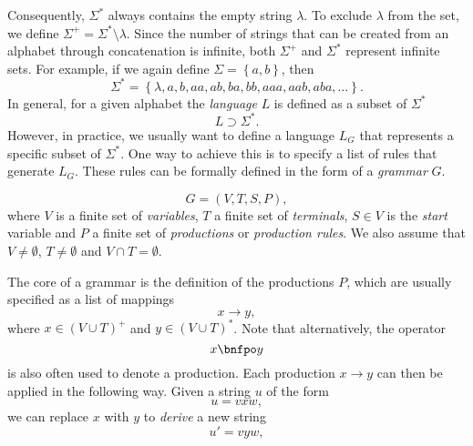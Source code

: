 Consequently, $\Sigma^*$ always contains the empty string $\lambda$.
To exclude $\lambda$ from the set, we define $\Sigma^+ = \Sigma^* \setminus \lambda$.
Since the number of strings that can be created from an alphabet through concatenation is infinite, both $\Sigma^+$ and $\Sigma^*$ represent infinite sets.
For example, if we again define $\Sigma = \left\{a, b\right\}$, then
\begin{equation*}
	\Sigma^{*} = \left\{\lambda, a, b, aa, ab, ba, bb, aaa, aab, aba, \dots \right\}.
\end{equation*} 
In general, for a given alphabet the \emph{language} $L$ is defined as a subset of $\Sigma^*$
\begin{equation}
	L \supset \Sigma^*.
	\label{eq:language-basic-definition}
\end{equation}
However, in practice, we usually want to define a language $L_G$ that represents a specific subset of $\Sigma^*$.
One way to achieve this is to specify a list of rules that generate $L_G$.
These rules can be formally defined in the form of a \emph{grammar} $G$.
\begin{definition}[Grammar]
	\begin{equation*}
		G = \left(V, T, S, P \right),
	\end{equation*}
	where $V$ is a finite set of \emph{variables},
	$T$ a finite set of \emph{terminals},
	$S \in V$ is the \emph{start} variable and 
	$P$ a finite set of \emph{productions} or \emph{production rules}.
	We also assume that $V \neq \emptyset$, $T \neq \emptyset$ and $V \cap T = \emptyset$.
\end{definition}
The core of a grammar is the definition of the productions $P$, which are usually specified as a list of mappings
\begin{equation}
	x \to y,
	\label{eq:unrestricted-production}
\end{equation}
where $x \in \left(V \cup T\right)^+$ and $y \in \left(V \cup T\right)^*$.
Note that alternatively, the operator
\begin{equation*}
	x \bnfpo y
\end{equation*}
is also often used to denote a production.
Each production $x \to y$ can then be applied in the following way.
Given a string $u$ of the form 
\begin{equation}
	u = vxw,
\end{equation}
we can replace $x$ with $y$ to \emph{derive} a new string
\begin{equation}
	u' = vyw,
\end{equation}
